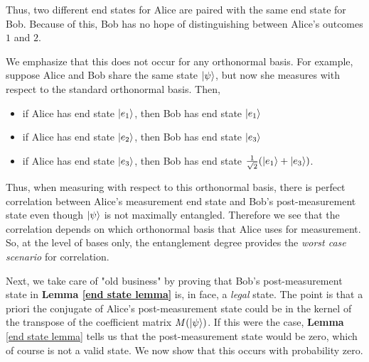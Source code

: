 \begin{example}
Thus, two different end states for Alice are paired with the same end state for Bob.  Because of this, Bob has no hope of distinguishing between Alice's outcomes $1$ and $2$.
\end{example} 
We emphasize that this does not occur for any orthonormal basis. For example, suppose Alice and Bob share the same state $\ket{\psi}$, but now she measures with respect to the standard orthonormal basis.  Then,

\begin{itemize}
\item if Alice has end state $\ket{e_1}$, then Bob has end state $\ket{e_1}$
\item if Alice has end state $\ket{e_2}$, then Bob has end state $\ket{e_3}$
\item if Alice has end state $\ket{e_3}$, then Bob has end state  $\frac{1}{\sqrt{2}}(\ket{e_1}+\ket{e_3})$.
\end{itemize}
Thus, when measuring with respect to this orthonormal basis, there is perfect correlation between Alice's measurement end state and Bob's post-measurement state even though $\ket{\psi}$ is not maximally entangled.  Therefore we see that the correlation depends on which orthonormal basis that Alice uses for measurement. So, at the level of bases only, the entanglement degree provides the \textit{worst case scenario} for correlation.











Next, we take care of "old business" by proving that Bob's post-measurement state in \textbf{Lemma \ref{end state lemma}} is, in face, a {\emph{legal}} state.  The point is that a priori the conjugate of Alice's post-measurement state could be in the kernel of the transpose of the coefficient matrix $M(\ket{\psi})$. If this were the case, {\bf{Lemma}} \ref{end state lemma} tells us that the post-measurement state would be zero, which of course is not a valid state.  We now show that this occurs with probability zero.

